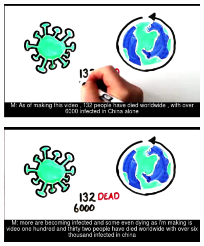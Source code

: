 \documentclass[natbib]{muthesis}
\begin{document}
 \begin{figure}[H]
 	\begin{minipage}{0.5\textwidth}
 		\centering
 		\includegraphics[width=0.9\textwidth]{images/example-video-aws} 
 		\label{fig:example-video-aws]}
 	\end{minipage}\hfill
 	\begin{minipage}{0.5\textwidth}
 		\centering
 		\includegraphics[width=0.9\textwidth]{images/example-video-cmusphinx} 
 		\label{fig:example-video-cmusphinx}
 	\end{minipage}
 \end{figure}
 
\end{document}
